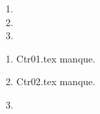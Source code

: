  
 
\begin{enumerate}
  \item  
  \item  
  \item  
\end{enumerate} 
\clearpage 
{}
\begin{enumerate}
  \item Ctr01.tex manque. 
  \item Ctr02.tex manque. 
  \item  
\end{enumerate} 
